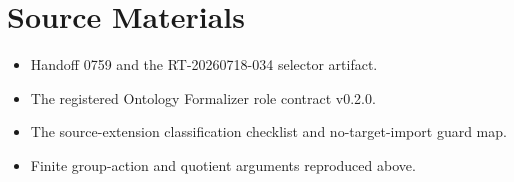 \documentclass[11pt]{article}
\begin{document}
\section{Source Materials}

\begin{itemize}[leftmargin=*]
  \item Handoff 0759 and the RT-20260718-034 selector artifact.
  \item The registered Ontology Formalizer role contract v0.2.0.
  \item The source-extension classification checklist and no-target-import
  guard map.
  \item Finite group-action and quotient arguments reproduced above.
\end{itemize}
\end{document}
